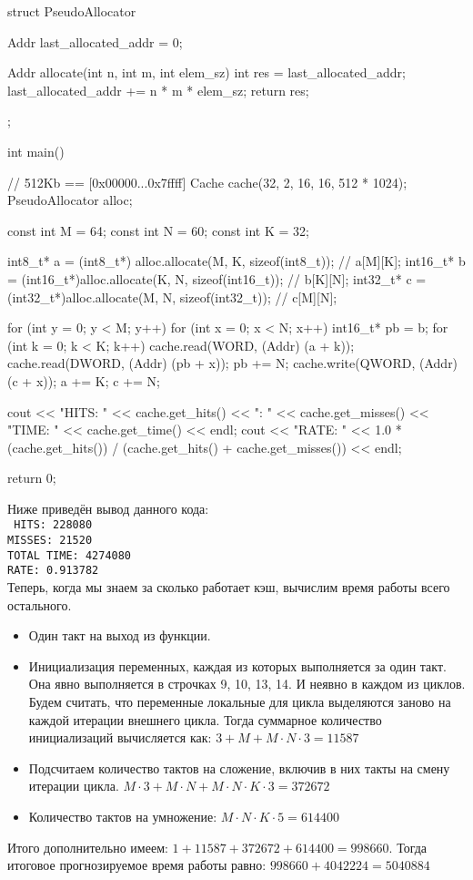 \documentclass[14pt, russian, onesize]{extreport}
\begin{document}
\begin{cppcode}
struct PseudoAllocator {
    Addr last_allocated_addr = 0;
    
    Addr allocate(int n, int m, int elem_sz) {
        int res = last_allocated_addr;
        last_allocated_addr += n * m * elem_sz;
        return res;
    }
};

int main() {
    // 512Kb == [0x00000...0x7ffff]
    Cache cache(32, 2, 16, 16, 512 * 1024);
    PseudoAllocator alloc;

    const int M = 64;
    const int N = 60;
    const int K = 32;

    int8_t*  a = (int8_t*) alloc.allocate(M, K, sizeof(int8_t));  // a[M][K];
    int16_t* b = (int16_t*)alloc.allocate(K, N, sizeof(int16_t)); // b[K][N];
    int32_t* c = (int32_t*)alloc.allocate(M, N, sizeof(int32_t)); // c[M][N];

    for (int y = 0; y < M; y++) {
        for (int x = 0; x < N; x++) {
            int16_t* pb = b;
            for (int k = 0; k < K; k++) {
                cache.read(WORD, (Addr) (a + k));
                cache.read(DWORD, (Addr) (pb + x));
                pb += N;
            }
            cache.write(QWORD, (Addr) (c + x));
        }
        a += K;
        c += N;
    }

    cout << "HITS: " << cache.get_hits() << "\nMISSES: " << cache.get_misses() << "\nTOTAL TIME: " << cache.get_time() << endl;
    cout << "RATE: " << 1.0 * (cache.get_hits()) / (cache.get_hits() + cache.get_misses()) << endl;

    return 0;
}
\end{cppcode}
Ниже приведён вывод данного кода:\\
\texttt{
HITS: 228080\\
MISSES: 21520\\
TOTAL TIME: 4274080\\
RATE: 0.913782\\
}
Теперь, когда мы знаем за сколько работает кэш, вычислим время
работы всего остального. 
\begin{itemize}
    \item 
        Один такт на выход из функции.
    \item 
        Инициализация переменных, каждая из которых выполняется
        за один такт. Она явно выполняется в строчках 9, 10, 13, 14. 
        И неявно в каждом из циклов. Будем считать, что переменные локальные
        для цикла выделяются заново на каждой итерации внешнего цикла.
        Тогда суммарное количество инициализаций вычисляется как: 
        $3 + M + M \cdot N \cdot 3 = 11587$ 
    \item 
        Подсчитаем количество тактов на сложение, включив в них
        такты на смену итерации цикла. 
        $M \cdot 3+ M \cdot N + M \cdot N \cdot K \cdot 3 = 372672$
    \item 
        Количество тактов на умножение: 
        $M \cdot N \cdot K \cdot 5 = 614400$ 
\end{itemize}
Итого дополнительно имеем: $1 + 11587 + 372672 + 614400 = 998660$.
Тогда итоговое прогнозируемое время работы равно:
$998660 + 4042224 = 5040884$
\end{document}

